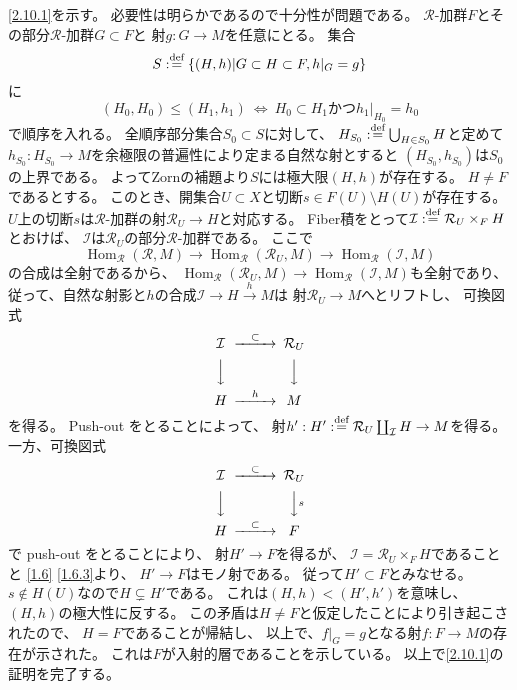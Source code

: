 \documentclass[uplatex,dvipdfmx]{jsarticle}
\makeatletter
\theoremstyle{definition}
\renewenvironment{proof}[1][\proofname]{
  \pushQED{\qed}%
  \normalfont \topsep6\p@\@plus6\p@\relax
  \trivlist
  \item[\hskip\labelsep
    #1\@addpunct{\textbf{.}}]\ignorespaces
}{%
  \popQED\endtrivlist\@endpefalse
}
\providecommand{\proofname}{証明}
\DeclareMathOperator{\Hom}{\mathrm{Hom}}
\newcommand\mcI{\mathcal{I}}
\newcommand\mcR{\mathcal{R}}
\def\dfn{:\overset{\mbox{{\scriptsize def}}}{=}}
\makeatother
\begin{document}
\begin{proof}
  \ref{2.10.1}を示す。
  必要性は明らかであるので十分性が問題である。
  \(\mcR\)-加群\(F\)とその部分\(\mcR\)-加群\(G\subset F\)と
  射\(g:G\to M\)を任意にとる。
  集合
  \[
  S\dfn \left\{ (H,h)\middle| G\subset H\subset F, h|_G=g\right\}
  \]
  に
  \[(H_0,H_0) \leq (H_1,h_1) \ \iff \ H_0\subset H_1 \text{かつ} h_1|_{H_0}=h_0\]
  で順序を入れる。
  全順序部分集合\(S_0\subset S\)に対して、
  \(H_{S_0}\dfn \bigcup_{H\in S_0}H\)と定めて
  \(h_{S_0}:H_{S_0}\to M\)を余極限の普遍性により定まる自然な射とすると
  \((H_{S_0},h_{S_0})\)は\(S_0\)の上界である。
  よってZornの補題より\(S\)には極大限\((H,h)\)が存在する。
  \(H\neq F\)であるとする。
  このとき、開集合\(U\subset X\)と切断\(s\in F(U)\setminus H(U)\)が存在する。
  \(U\)上の切断\(s\)は\(\mcR\)-加群の射\(\mcR_U\to H\)と対応する。
  Fiber積をとって\(\mcI\dfn \mcR_U\times_FH\)とおけば、
  \(\mcI\)は\(\mcR_U\)の部分\(\mcR\)-加群である。
  ここで
  \[
  \Hom_{\mcR}(\mcR,M)\to \Hom_{\mcR}(\mcR_U,M)\to \Hom_{\mcR}(\mcI,M)
  \]
  の合成は全射であるから、
  \(\Hom_{\mcR}(\mcR_U,M)\to \Hom_{\mcR}(\mcI,M)\)も全射であり、
  従って、自然な射影と\(h\)の合成\(\mcI\to H\xrightarrow{h}M\)は
  射\(\mcR_U\to M\)へとリフトし、
  可換図式
  \[
  \begin{CD}
    \mcI @> \subset >> \mcR_U \\
    @VVV @VVV \\
    H @> h >> M
  \end{CD}
  \]
  を得る。
  Push-out をとることによって、
  射\(h':H'\dfn \mcR_U\coprod_{\mcI}H \to M\)を得る。
  一方、可換図式
  \[
  \begin{CD}
    \mcI @> \subset >> \mcR_U \\
    @VVV @VV s V \\
    H @> \subset >> F
  \end{CD}
  \]
  で push-out をとることにより、
  射\(H' \to F\)を得るが、
  \(\mcI=\mcR_U\times_F H\)であることと
  \autoref{1.6} \ref{1.6.3}より、
  \(H'\to F\)はモノ射である。
  従って\(H'\subset F\)とみなせる。
  \(s\not\in H(U)\)なので\(H\subsetneq H'\)である。
  これは\((H,h) < (H',h')\)を意味し、\((H,h)\)の極大性に反する。
  この矛盾は\(H\neq F\)と仮定したことにより引き起こされたので、
  \(H=F\)であることが帰結し、
  以上で、\(f|_G=g\)となる射\(f:F\to M\)の存在が示された。
  これは\(F\)が入射的層であることを示している。
  以上で\ref{2.10.1}の証明を完了する。


\end{proof}
\end{document}
